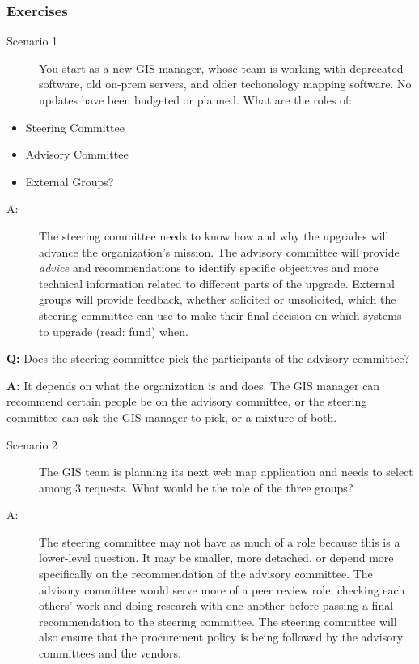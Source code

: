 \documentclass[
  letterpaper,
  DIV=11,
  numbers=noendperiod]{scrartcl}
\providecommand{\tightlist}{%
  \setlength{\itemsep}{0pt}\setlength{\parskip}{0pt}}\usepackage{longtable,booktabs,array}
\begin{document}
\subsubsection{Exercises}\label{exercises}

\begin{description}
\item[Scenario 1]
You start as a new GIS manager, whose team is working with deprecated
software, old on-prem servers, and older techonology mapping software.
No updates have been budgeted or planned. What are the roles of:
\end{description}

\begin{itemize}
\tightlist
\item
  Steering Committee
\item
  Advisory Committee
\item
  External Groups?
\end{itemize}

\begin{description}
\item[A:]
The steering committee needs to know how and why the upgrades will
advance the organization's mission. The advisory committee will provide
\emph{advice} and recommendations to identify specific objectives and
more technical information related to different parts of the upgrade.
External groups will provide feedback, whether solicited or unsolicited,
which the steering committee can use to make their final decision on
which systems to upgrade (read: fund) when.
\end{description}

\textbf{Q:} Does the steering committee pick the participants of the
advisory committee?

\textbf{A:} It depends on what the organization is and does. The GIS
manager can recommend certain people be on the advisory committee, or
the steering committee can ask the GIS manager to pick, or a mixture of
both.

\begin{description}
\item[Scenario 2]
The GIS team is planning its next web map application and needs to
select among 3 requests. What would be the role of the three groups?
\item[A:]
The steering committee may not have as much of a role because this is a
lower-level question. It may be smaller, more detached, or depend more
specifically on the recommendation of the advisory committee. The
advisory committee would serve more of a peer review role; checking each
others' work and doing research with one another before passing a final
recommendation to the steering committee. The steering committee will
also ensure that the procurement policy is being followed by the
advisory committees and the vendors.
\end{description}
\end{document}
